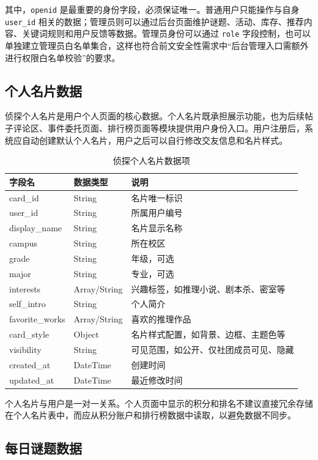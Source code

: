 \documentclass[a4paper,12pt]{article}
\begin{document}
其中，\texttt{openid} 是最重要的身份字段，必须保证唯一。普通用户只能操作与自身 \texttt{user\_id} 相关的数据；管理员则可以通过后台页面维护谜题、活动、库存、推荐内容、关键词规则和用户反馈等数据。管理员身份可以通过 \texttt{role} 字段控制，也可以单独建立管理员白名单集合，这样也符合前文安全性需求中“后台管理入口需额外进行权限白名单校验”的要求。

\subsection{个人名片数据}

侦探个人名片是用户个人页面的核心数据。个人名片既承担展示功能，也为后续帖子评论区、事件委托页面、排行榜页面等模块提供用户身份入口。用户注册后，系统应自动创建默认个人名片，用户之后可以自行修改交友信息和名片样式。

\begin{longtable}{p{3.5cm}p{3cm}p{7cm}}
\caption{侦探个人名片数据项} \\
\toprule
字段名 & 数据类型 & 说明 \\
\midrule
card\_id & String & 名片唯一标识 \\
user\_id & String & 所属用户编号 \\
display\_name & String & 名片显示名称 \\
campus & String & 所在校区 \\
grade & String & 年级，可选 \\
major & String & 专业，可选 \\
interests & Array/String & 兴趣标签，如推理小说、剧本杀、密室等 \\
self\_intro & String & 个人简介 \\
favorite\_works & Array/String & 喜欢的推理作品 \\
card\_style & Object & 名片样式配置，如背景、边框、主题色等 \\
visibility & String & 可见范围，如公开、仅社团成员可见、隐藏 \\
created\_at & DateTime & 创建时间 \\
updated\_at & DateTime & 最近修改时间 \\
\bottomrule
\end{longtable}

个人名片与用户是一对一关系。个人页面中显示的积分和排名不建议直接冗余存储在个人名片表中，而应从积分账户和排行榜数据中读取，以避免数据不同步。

\subsection{每日谜题数据}
\end{document}
